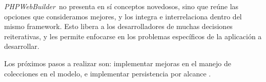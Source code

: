 \documentclass[a4paper,10pt]{article}
\newcommand{\comment}[1]{}
\newcommand{\PWB}{\emph{PHPWebBuilder}}
\newcommand{\sourcecode}[1]{
\begin{minipage}{12cm}
\begin{lgrind}

\end{lgrind}
\end{minipage}
}
\begin{document}
\PWB\ no presenta en sí conceptos novedosos, sino que reúne las opciones que consideramos mejores, y los integra e interrelaciona dentro del mismo framework. Esto libera a los desarrolladores de muchas decisiones reiterativas, y les permite enfocarse en los problemas específicos de la aplicación a desarrollar.

Los próximos pasos a realizar son: implementar mejoras en el manejo de colecciones en el modelo, e implementar persistencia por alcance \cite{jpox,jdo}.






\comment{
\setcounter{section}{0}
\newpage
\section*{Apéndices}
\section{Código completo}

Modelo:

\sourcecode{src/Post.class.php.tex}
\sourcecode{src/Tag.class.php.tex}

Controller:

\sourcecode{src/PostItem.class.php.tex}
\sourcecode{src/PostList.class.php.tex}
\sourcecode{src/BlogComponent.class.php.tex}
}
\end{document}

